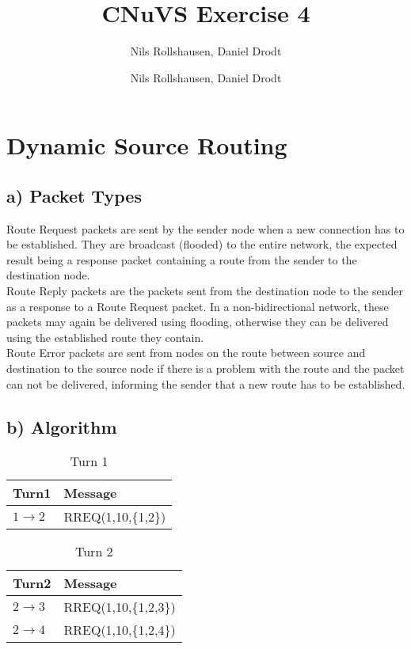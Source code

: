 \documentclass[a4paper, 11 pt, article, accentcolor=tud7b]{tudreport}
\title{CNuVS Exercise 4}
\author{Nils Rollshausen, Daniel Drodt}
\subtitle{Nils Rollshausen, Daniel Drodt}
\begin{document}
	\maketitle
	\section{Dynamic Source Routing}
	\subsection*{a) Packet Types}
	Route Request packets are sent by the sender node when a new connection has to be established. They are broadcast (flooded) to the entire network, the expected result being a response packet containing a route from the sender to the destination node. \medskip \\
	Route Reply packets are the packets sent from the destination node to the sender as a response to a Route Request packet. In a non-bidirectional network, these packets may again be delivered using flooding, otherwise they can be delivered using the established route they contain. \medskip \\
	Route Error packets are sent from nodes on the route between source and destination to the source node if there is a problem with the route and the packet can not be delivered, informing the sender that a new route has to be established.
	
	\subsection*{b) Algorithm}
	
	\begin{table}[h]
	  \centering
	  \begin{tabular}{| l | l |}
	    \hline
	    Turn1  & Message \\ \hline
	    $1 \rightarrow 2$ & RREQ(1,10,\{1,2\}) \\ \hline 
	  \end{tabular}
	  \caption{Turn 1}
	\end{table}
	
	\begin{table}[h]
	  \centering
	  \begin{tabular}{| l | l |}
	    \hline
	    Turn2  & Message \\ \hline
	    $2 \rightarrow 3$ & RREQ(1,10,\{1,2,3\}) \\ \hline 
	    $2 \rightarrow 4$ & RREQ(1,10,\{1,2,4\}) \\ \hline 
	  \end{tabular}
	  \caption{Turn 2}
	\end{table}
	
\end{document}
